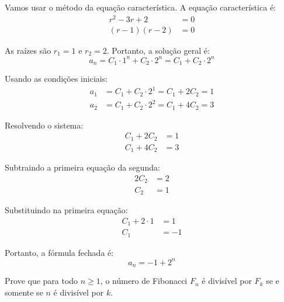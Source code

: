 \documentclass[12pt,a4paper]{article}
\begin{document}
\begin{tcolorbox}[colback=green!5!white,colframe=green!75!black,title=Resolução]
Vamos usar o método da equação característica. A equação característica é:
\begin{align}
r^2 - 3r + 2 &= 0\\
(r-1)(r-2) &= 0
\end{align}

As raízes são $r_1 = 1$ e $r_2 = 2$. Portanto, a solução geral é:
\begin{equation}
a_n = C_1 \cdot 1^n + C_2 \cdot 2^n = C_1 + C_2 \cdot 2^n
\end{equation}

Usando as condições iniciais:
\begin{align}
a_1 &= C_1 + C_2 \cdot 2^1 = C_1 + 2C_2 = 1\\
a_2 &= C_1 + C_2 \cdot 2^2 = C_1 + 4C_2 = 3
\end{align}

Resolvendo o sistema:
\begin{align}
C_1 + 2C_2 &= 1\\
C_1 + 4C_2 &= 3
\end{align}

Subtraindo a primeira equação da segunda:
\begin{align}
2C_2 &= 2\\
C_2 &= 1
\end{align}

Substituindo na primeira equação:
\begin{align}
C_1 + 2 \cdot 1 &= 1\\
C_1 &= -1
\end{align}

Portanto, a fórmula fechada é:
\begin{equation}
a_n = -1 + 2^n
\end{equation}
\end{tcolorbox}

\begin{tcolorbox}[colback=blue!5!white,colframe=blue!75!black,title=Exercício A2]
Prove que para todo $n \geq 1$, o número de Fibonacci $F_n$ é divisível por $F_k$ se e somente se $n$ é divisível por $k$.
\end{tcolorbox}
\end{document}
